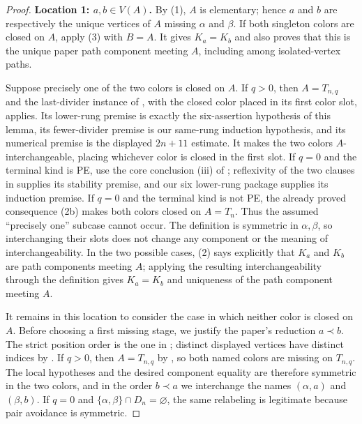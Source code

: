 \begin{proof}
\textbf{Location 1: $a,b\in V(A)$.}
By (1), $A$ is elementary; hence $a$ and $b$ are respectively the
unique vertices of $A$ missing $\alpha$ and $\beta$.  If both singleton
colors are closed on $A$, apply (3) with $B=A$.  It gives $K_a=K_b$ and
also proves that this is the unique paper path component meeting $A$,
including among isolated-vertex paths.                                   

Suppose precisely one of the two colors is closed on $A$.  If $q>0$,
then $A=T_{n,q}$ and the last-divider instance of
, with the closed color placed in its first color slot,
applies.  Its lower-rung premise is exactly the six-assertion hypothesis
of this lemma, its fewer-divider premise is our same-rung induction
hypothesis, and its numerical premise is the displayed $2n+11$ estimate.
It makes the two colors $A$-interchangeable, placing whichever color is
closed in the first slot.  If $q=0$ and the terminal
kind is PE, use the core conclusion (iii) of
; reflexivity of the two clauses in
 supplies its stability premise, and
our six lower-rung package supplies its induction premise.  If $q=0$
and the terminal kind is not PE, the already proved consequence (2b)
makes both colors closed on $A=T_n$.  Thus the assumed ``precisely one''
subcase cannot occur.  The definition 
is symmetric in $\alpha,\beta$, so interchanging their slots does not
change any component or the meaning of interchangeability.  In the two
possible cases, (2) says explicitly
that $K_a$ and $K_b$ are path components meeting $A$; applying the
resulting interchangeability through the definition
 gives $K_a=K_b$ and uniqueness of the path
component meeting $A$.                                                 

It remains in this location to consider the case in which neither color
is closed on $A$.  Before choosing a first missing stage, we justify the
paper's reduction $a\prec b$.  The strict position order is the one in
; distinct displayed vertices have distinct
indices by .  If $q>0$, then
$A=T_{n,q}$ by , so both named colors are
missing on $T_{n,q}$.  The local hypotheses and the desired component
equality are therefore symmetric in the two colors, and in the order
$b\prec a$ we interchange the names $(\alpha,a)$ and $(\beta,b)$.  If
$q=0$ and $\{\alpha,\beta\}\cap D_n=\varnothing$, the same relabeling is
legitimate because pair avoidance is symmetric.


\end{proof}
